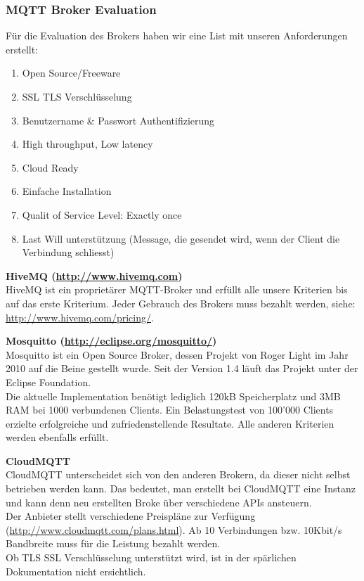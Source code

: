 \subsubsection{MQTT Broker Evaluation}
Für die Evaluation des Brokers haben wir eine List mit unseren Anforderungen erstellt: 

\begin{enumerate}
	\item Open Source/Freeware
	\item SSL TLS Verschlüsselung
	\item Benutzername \& Passwort Authentifizierung
	\item High throughput, Low latency
	\item Cloud Ready
	\item Einfache Installation
	\item Qualit of Service Level: Exactly once
	\item Last Will unterstützung (Message, die gesendet wird, wenn der Client die Verbindung schliesst)
\end{enumerate}

\textbf{HiveMQ (\url{http://www.hivemq.com})} \\
HiveMQ ist ein proprietärer MQTT-Broker und erfüllt alle unsere Kriterien bis auf das erste Kriterium. Jeder Gebrauch des Brokers muss bezahlt werden, siehe: \url{http://www.hivemq.com/pricing/}.

\textbf{Mosquitto (\url{http://eclipse.org/mosquitto/})}\\
Mosquitto ist ein Open Source Broker, dessen Projekt von Roger Light im Jahr 2010 auf die Beine gestellt wurde. Seit der Version 1.4 läuft das Projekt unter der Eclipse Foundation. \\
Die aktuelle Implementation benötigt lediglich 120kB Speicherplatz und 3MB RAM bei 1000 verbundenen Clients. Ein Belastungstest von 100'000 Clients erzielte erfolgreiche und zufriedenstellende Resultate.
Alle anderen Kriterien werden ebenfalls erfüllt.

\textbf{CloudMQTT} \\
CloudMQTT unterscheidet sich von den anderen Brokern, da dieser nicht selbst betrieben werden kann. Das bedeutet, man erstellt bei CloudMQTT eine Instanz und kann denn neu erstellten Broke über verschiedene APIs ansteuern. \\
Der Anbieter stellt verschiedene Preispläne zur Verfügung (\url{http://www.cloudmqtt.com/plans.html}). Ab 10 Verbindungen bzw. 10Kbit/s Bandbreite muss für die Leistung bezahlt werden. \\
Ob TLS SSL Verschlüsselung unterstützt wird, ist in der spärlichen Dokumentation nicht ersichtlich.

